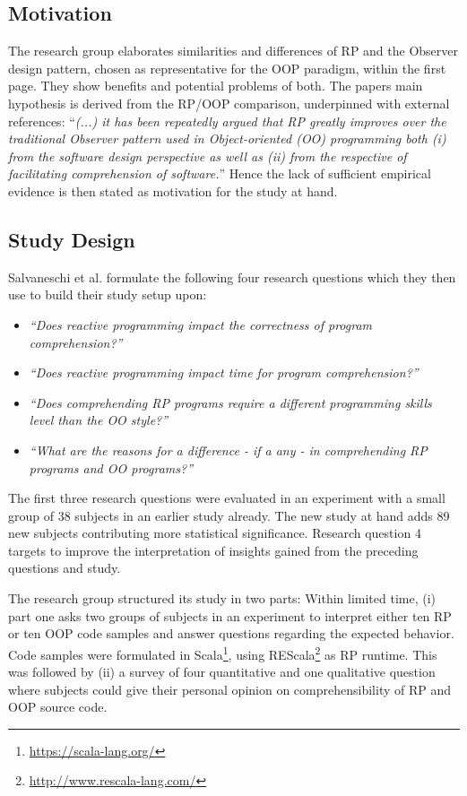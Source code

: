 \documentclass[12pt,a4paper]{article}
\begin{document}
\subsection{Motivation}
The research group elaborates similarities and differences of RP and the Observer design pattern, chosen as representative for the OOP paradigm, within the first page. They show benefits and potential problems of both. The papers main hypothesis is derived from the RP/OOP comparison, underpinned with external references: ``\emph{(...) it has been repeatedly argued that RP greatly improves over the traditional Observer pattern used in Object-oriented (OO) programming both (i) from the software design perspective as well as (ii) from the respective of facilitating comprehension of software.}'' \cite{7827078} Hence the lack of sufficient empirical evidence is then stated as motivation for the study at hand.

\subsection{Study Design}
Salvaneschi et al. \cite{7827078} formulate the following four research questions which they then use to build their study setup upon:

\begin{itemize}
	\item \emph{``Does reactive programming impact the correctness of program comprehension?''}
	\item \emph{``Does reactive programming impact time for program comprehension?''}
	\item \emph{``Does comprehending RP programs require a different programming skills level than the OO style?''}
	\item \emph{``What are the reasons for a difference - if a any - in comprehending RP programs and OO programs?''}
\end{itemize}

The first three research questions were evaluated in an experiment with a small group of 38 subjects in an earlier study \cite{Salvaneschi:2014:ESP:2635868.2635895} already. The new study at hand adds 89 new subjects contributing more statistical significance. Research question 4 targets to improve the interpretation of insights gained from the preceding questions and study.

The research group structured its study in two parts: Within limited time, (i) part one asks two groups of subjects in an experiment to interpret either ten RP or ten OOP code samples and answer questions regarding the expected behavior. Code samples were formulated in Scala\footnote{\url{https://scala-lang.org/}}, using REScala\footnote{\url{http://www.rescala-lang.com/}} as RP runtime. This was followed by (ii) a survey of four quantitative and one qualitative question where subjects could give their personal opinion on comprehensibility of RP and OOP source code.
\end{document}
